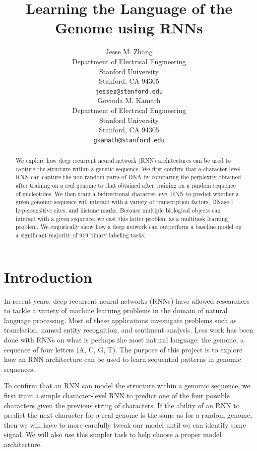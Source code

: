 \documentclass{article} %
\title{Learning the Language of the Genome using RNNs}
\author{
Jesse M. Zhang \\
Department of Electrical Engineering \\
Stanford University \\
Stanford, CA 94305 \\
\texttt{jessez@stanford.edu} \\
\And
Govinda M. Kamath \\
Department of Electrical Engineering\\
Stanford University\\
Stanford, CA 94305 \\
\texttt{gkamath@stanford.edu} \\
}
\begin{document}
\maketitle

\begin{abstract}
We explore how deep recurrent neural network (RNN) architectures can be used to capture the structure within a genetic sequence. We first confirm that a character-level RNN can capture the non-random parts of DNA by comparing the perplexity obtained after training on a real genome to that obtained after training on a random sequence of nucleotides. We then train a bidirectional character-level RNN to predict whether a given genomic sequence will interact with a variety of transcription factors, DNase I hypersensitive sites, and histone marks. Because multiple biological objects can interact with a given sequence, we cast this latter problem as a multitask learning problem. We empirically show how a deep network can outperform a baseline model on a significant majority of $919$ binary labeling tasks. 
\end{abstract}

\section{Introduction}
In recent years, deep recurrent neural networks (RNNs) have allowed researchers to tackle a variety of machine learning problems in the domain of natural language processing. Most of these applications investigate problems such as translation, named entity recognition, and sentiment analysis. Less work has been done with RNNs on what is perhaps the most natural language: the genome, a sequence of four letters (A, C, G, T). The purpose of this project is to explore how an RNN architecture can be used to learn sequential patterns in genomic sequences.

To confirm that an RNN can model the structure within a genomic sequence, we first train a simple character-level RNN to predict one of the four possible characters given the previous string of characters. If the ability of an RNN to predict the next character for a real genome is the same as for a random genome, then we will have to more carefully tweak our model until we can identify some signal. We will also use this simpler task to help choose a proper model architecture.
\end{document}
